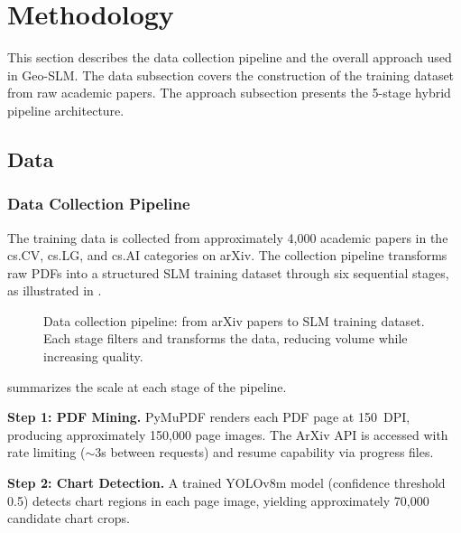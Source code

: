 \section{Methodology}

This section describes the data collection pipeline and the overall approach used in
Geo-SLM. The data subsection covers the construction of the training dataset from raw
academic papers. The approach subsection presents the 5-stage hybrid pipeline architecture.

\subsection{Data}

\subsubsection{Data Collection Pipeline}

The training data is collected from approximately 4,000 academic papers in the cs.CV,
cs.LG, and cs.AI categories on arXiv. The collection pipeline transforms raw PDFs into
a structured SLM training dataset through six sequential stages, as illustrated in
.

\begin{figure}[htbp]
\centering

\caption{Data collection pipeline: from arXiv papers to SLM training dataset.
    Each stage filters and transforms the data, reducing volume while increasing quality.}
\label{fig:data_pipeline}
\end{figure}

 summarizes the scale at each stage of the pipeline.

\begin{table}[htbp]
\centering
\caption{Data pipeline scale at each processing stage.}
\label{tab:data_scale}

\end{table}

\textbf{Step 1: PDF Mining.}
PyMuPDF renders each PDF page at 150~DPI, producing approximately 150,000 page images.
The ArXiv API is accessed with rate limiting ($\sim$3s between requests) and resume
capability via progress files.

\textbf{Step 2: Chart Detection.}
A trained YOLOv8m model (confidence threshold 0.5) detects chart regions in each page
image, yielding approximately 70,000 candidate chart crops.

